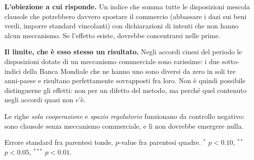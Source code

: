 \begin{table}[htbp]
\begin{threeparttable}
\begin{tablenotes}[flushleft]
\item \textbf{L'obiezione a cui risponde.} Un indice che somma tutte le disposizioni mescola clausole che potrebbero davvero spostare il commercio (abbassare i dazi sui beni verdi, imporre standard vincolanti) con dichiarazioni di intenti che non hanno alcun meccanismo. Se l'effetto esiste, dovrebbe concentrarsi nelle prime.
\item \textbf{Il limite, che \`e esso stesso un risultato.} Negli accordi cinesi del periodo le disposizioni dotate di un meccanismo commerciale sono rarissime: i due sotto-indici della Banca Mondiale che ne hanno uno sono diversi da zero in soli tre anni-paese e risultano perfettamente sovrapposti fra loro. Non \`e quindi possibile distinguerne gli effetti: non per un difetto del metodo, ma perch\'e quel contenuto negli accordi quasi non c'\`e.
\item Le righe \emph{sola cooperazione} e \emph{spazio regolatorio} funzionano da controllo negativo: sono clausole senza meccanismo commerciale, e l\`i non dovrebbe emergere nulla.
\item Errore standard fra parentesi tonde, $p$-value fra parentesi quadre. $^{*}$ $p<0.10$, $^{**}$ $p<0.05$, $^{***}$ $p<0.01$.
\end{tablenotes}
\end{threeparttable}
\end{table}
